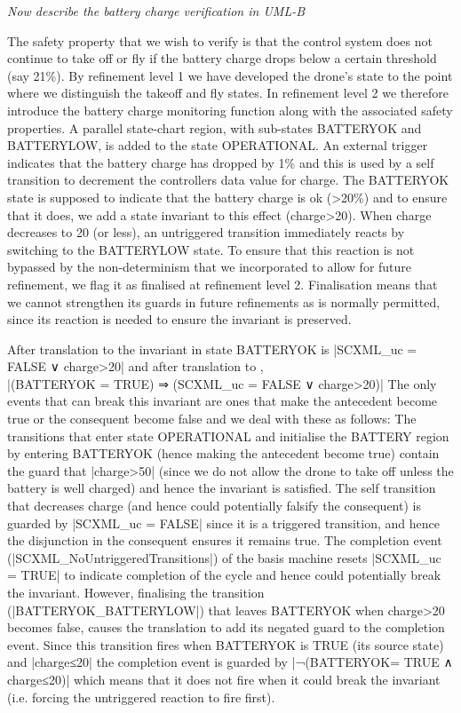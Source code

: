 \emph{Now describe the battery charge verification in UML-B}

The safety property that we wish to verify is that the control system does not continue to take off or fly if the battery charge drops below a certain threshold (say 21\%). 
By refinement level 1 we have developed the drone's state to the point where we distinguish the takeoff and fly states.
In refinement level 2 we therefore introduce the battery charge monitoring function along with the associated safety properties.
A parallel state-chart region, with sub-states BATTERYOK and BATTERYLOW, is added to the state OPERATIONAL.
An external trigger indicates that the battery charge has dropped by 1\% and this is used by a self transition to decrement the controllers data value for charge.
The BATTERYOK state is supposed to indicate that the battery charge is ok (>20\%) and to ensure that it does, we add a state invariant to this effect (charge>20).
When charge decreases to 20 (or less), an untriggered transition immediately reacts by switching to the BATTERYLOW state.
To ensure that this reaction is not bypassed by the non-determinism that we incorporated to allow for future refinement, we flag it as finalised at refinement level 2.
Finalisation means that we cannot strengthen its guards in future refinements as is normally permitted, since its reaction is needed to ensure the invariant is preserved.

After translation to \UMLB the invariant in state BATTERYOK is |SCXML_uc = FALSE ∨ charge>20| and after translation to \EVENTB, \\
|(BATTERYOK = TRUE) ⇒ (SCXML_uc = FALSE ∨ charge>20)|
The only events that can break this invariant are ones that make the antecedent become true or the consequent become false and we deal with these as follows:
The transitions that enter state OPERATIONAL and initialise the BATTERY region by entering BATTERYOK (hence making the antecedent become true) contain the guard that |charge>50| (since we do not allow the drone to take off unless the battery is well charged) and hence the invariant is satisfied.
The self transition that decreases charge (and hence could potentially falsify the consequent) is guarded by |SCXML_uc = FALSE| since it is a triggered transition, and hence the disjunction in the consequent ensures it remains true.
The completion event (|SCXML_NoUntriggeredTransitions|) of the basis machine resets |SCXML_uc = TRUE| to indicate completion of the cycle and hence could potentially break the invariant. 
However, finalising the transition (|BATTERYOK_BATTERYLOW|) that leaves BATTERYOK when charge>20 becomes false, causes the translation to add its negated guard to the completion event.
Since this transition fires when BATTERYOK is TRUE (its source state) and |charge≤20| the completion event is guarded by |¬(BATTERYOK= TRUE ∧ charge≤20)| which means that it does not fire when it could break the invariant (i.e. forcing the untriggered reaction to fire first).











